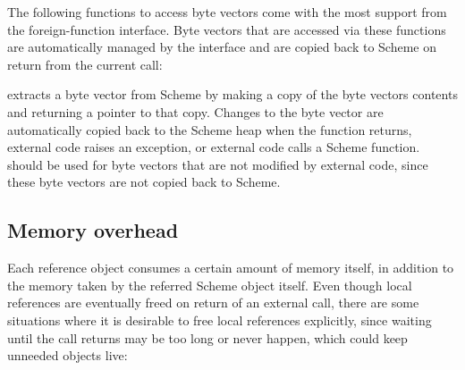 The following functions to access byte vectors come with the most
support from the foreign-function interface.  Byte vectors that are
accessed via these functions are automatically managed by the
interface and are copied back to Scheme on return from the current
call:

\begin{protos}
\end{protos}

 extracts a byte vector from
Scheme by making a copy of the byte vectors contents and returning a
pointer to that copy.  Changes to the byte vector are automatically
copied back to the Scheme heap when the function returns, external
code raises an exception, or external code calls a Scheme function.
 should be used for byte
vectors that are not modified by external code, since these byte
vectors are not copied back to Scheme.

\subsection{Memory overhead}
\label{sec:memory-overhead}

Each reference object consumes a certain amount of memory itself, in
addition to the memory taken by the referred Scheme object itself.
Even though local references are eventually freed on return of an
external call, there are some situations where it is desirable to free
local references explicitly, since waiting until the call returns may
be too long or never happen, which could keep unneeded objects live:

